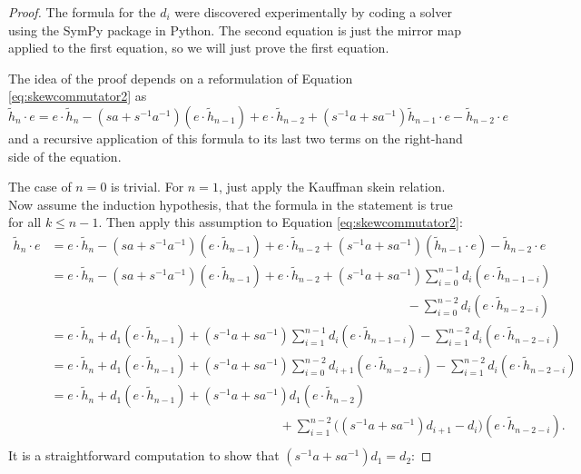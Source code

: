 \begin{proof}
The formula for the $d_i$ were discovered experimentally by coding a solver using the SymPy package in Python. The second equation is just the mirror map applied to the first equation, so we will just prove the first equation.

The idea of the proof depends on a reformulation of Equation \eqref{eq:skewcommutator2} as
\[
\tilde{h}_n \cdot e = e \cdot \tilde{h}_n - ( s a + s^{-1} a^{-1} ) ( e \cdot \tilde{h}_{n-1} ) + e \cdot \tilde{h}_{n-2} + ( s^{-1} a + s a^{-1} ) \tilde{h}_{n-1} \cdot e - \tilde{h}_{n-2} \cdot e
\]
and a recursive application of this formula to its last two terms on the right-hand side of the equation. 

The case of $n=0$ is trivial. For $n=1$, just apply the Kauffman skein relation. Now assume the induction hypothesis, that the formula in the statement is true for all $k \leq n-1$. Then apply this assumption to Equation \eqref{eq:skewcommutator2}:
\begin{align*}
\tilde{h}_n \cdot e &= e \cdot \tilde{h}_n - ( s a + s^{-1} a^{-1} ) ( e \cdot \tilde{h}_{n-1} ) + e \cdot \tilde{h}_{n-2} + ( s^{-1} a + s a^{-1} ) ( \tilde{h}_{n-1} \cdot e ) - \tilde{h}_{n-2} \cdot e \\
&= e \cdot \tilde{h}_n - ( s a + s^{-1} a^{-1} ) ( e \cdot \tilde{h}_{n-1} ) + e \cdot \tilde{h}_{n-2} + ( s^{-1} a + s a^{-1} ) \sum_{i=0}^{n-1} d_i (e \cdot \tilde{h}_{n-1-i}) \\
&\qquad\qquad\qquad\qquad\qquad\qquad\qquad\qquad\qquad\qquad\qquad\qquad\qquad\qquad - \sum_{i=0}^{n-2} d_i (e \cdot \tilde{h}_{n-2-i}) \\
&= e \cdot \tilde{h}_n + d_1 ( e \cdot \tilde{h}_{n-1} ) + ( s^{-1} a + s a^{-1} ) \sum_{i=1}^{n-1} d_i (e \cdot \tilde{h}_{n-1-i}) - \sum_{i=1}^{n-2} d_i (e \cdot \tilde{h}_{n-2-i}) \\
&= e \cdot \tilde{h}_n + d_1 ( e \cdot \tilde{h}_{n-1} ) + ( s^{-1} a + s a^{-1} ) \sum_{i=0}^{n-2} d_{i+1} (e \cdot \tilde{h}_{n-2-i}) - \sum_{i=1}^{n-2} d_i (e \cdot \tilde{h}_{n-2-i}) \\
&= e \cdot \tilde{h}_n + d_1 ( e \cdot \tilde{h}_{n-1} ) + ( s^{-1} a + s a^{-1} ) d_1 ( e \cdot \tilde{h}_{n-2} ) \\
&\qquad\qquad\qquad\qquad\qquad\qquad\qquad\qquad\quad\quad+ \sum_{i=1}^{n-2} \big( ( s^{-1} a + s a^{-1} ) d_{i+1} - d_i \big) (e \cdot \tilde{h}_{n-2-i}). \\
\end{align*}
It is a straightforward computation to show that $( s^{-1} a + s a^{-1} ) d_1 = d_2$:

\end{proof}
